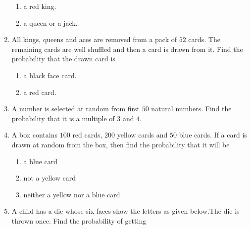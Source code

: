 \documentclass[journal,12pt,onecolumn]{IEEEtran}
\theoremstyle{remark}
\begin{document}
\begin{enumerate}
\begin{enumerate}[label=\Roman*.]
\item a red king.\\
\item a queen or a jack.\\
\end{enumerate}
\item All kings, queens and aces are removed from a pack of $52$ cards. The remaining cards are well shuffled and then a card is drawn from it. Find the probability that the drawn card is \\
\begin{enumerate}[label=\Roman*.]
\item a black face card.\\
\item a red card.\\
\end{enumerate}

\item A number is selected at random from first $50$ natural numbers. Find the probability that it is a multiple of $3$ and $4$.\\
\item A box contains $100$ red cards, $200$ yellow cards and $50$ blue cards. If a card is drawn at random from the box, then find the probability that it will be \begin{enumerate}[label=\Roman*.]
\item a blue card
\item not a yellow card
\item neither a yellow nor a blue card.\\
\end{enumerate}

\item A child has a die whose six faces show the letters as given below.The die is thrown once. Find the probability of getting\\
\begin{figure}[ht]
\centering
{}
\end{figure}
\end{enumerate}
\end{document}
